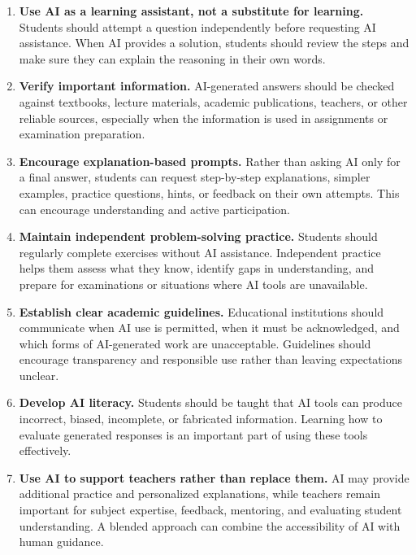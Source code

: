 \documentclass[12pt,a4paper]{article}
\begin{document}
\begin{enumerate}
    \item \textbf{Use AI as a learning assistant, not a substitute for learning.}
    Students should attempt a question independently before requesting AI assistance. When AI provides a solution, students should review the steps and make sure they can explain the reasoning in their own words.

    \item \textbf{Verify important information.}
    AI-generated answers should be checked against textbooks, lecture materials, academic publications, teachers, or other reliable sources, especially when the information is used in assignments or examination preparation.

    \item \textbf{Encourage explanation-based prompts.}
    Rather than asking AI only for a final answer, students can request step-by-step explanations, simpler examples, practice questions, hints, or feedback on their own attempts. This can encourage understanding and active participation.

    \item \textbf{Maintain independent problem-solving practice.}
    Students should regularly complete exercises without AI assistance. Independent practice helps them assess what they know, identify gaps in understanding, and prepare for examinations or situations where AI tools are unavailable.

    \item \textbf{Establish clear academic guidelines.}
    Educational institutions should communicate when AI use is permitted, when it must be acknowledged, and which forms of AI-generated work are unacceptable. Guidelines should encourage transparency and responsible use rather than leaving expectations unclear.

    \item \textbf{Develop AI literacy.}
    Students should be taught that AI tools can produce incorrect, biased, incomplete, or fabricated information. Learning how to evaluate generated responses is an important part of using these tools effectively.

    \item \textbf{Use AI to support teachers rather than replace them.}
    AI may provide additional practice and personalized explanations, while teachers remain important for subject expertise, feedback, mentoring, and evaluating student understanding. A blended approach can combine the accessibility of AI with human guidance.

\end{enumerate}
\end{document}
